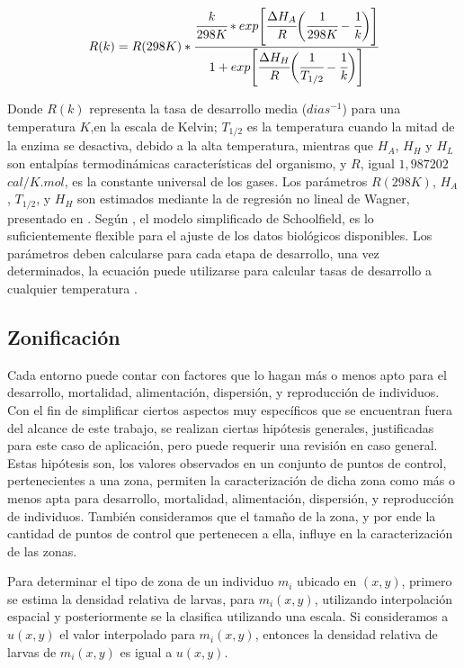 \begin{equation} \label{eq:schoolfield}
   R(k)  = R(298K) *\cfrac{ \cfrac{k}{298K} *
    exp \Bigg[
            \cfrac{\Delta H_{A}}{R} \bigg(\cfrac{1}{298K} - \cfrac{1}{k}\bigg)
        \Bigg]}
    {1 + exp\Bigg[\cfrac{\Delta H_{H}}{R} \bigg(\cfrac{1}{T_{1/2}}- \cfrac{1}{k}\bigg)\Bigg] }
\end{equation}

Donde $R(k)$ representa la tasa de desarrollo media ($dias^{-1}$) para una temperatura $K$,en la
escala de Kelvin; $T_{1/2}$ es la temperatura cuando la mitad de la enzima se desactiva, debido a
la alta temperatura, mientras que $H_{A}$, $H_{H}$ y $H_{L}$ son entalpías termodinámicas
características del organismo, y $R$, igual $1,987202$ $cal/K.mol$, es la constante universal de
los gases. Los parámetros $R(298K)$, $H_{A}$, $T_{1/2}$, y $H_{H}$ son estimados mediante la
de regresión no lineal de Wagner, presentado en \cite{wagner1984modeling}. Según
\cite{otero2006stochastic}, el modelo simplificado de Schoolfield, es lo suficientemente
flexible para el ajuste de los datos biológicos disponibles. Los parámetros deben calcularse para
cada etapa de desarrollo, una vez determinados, la ecuación puede utilizarse para calcular tasas
de desarrollo a cualquier temperatura \cite{rueda1990temperature}.

\subsection{Zonificación}
\label{subsec:cap4-zonificacion}
Cada entorno puede contar con factores que lo hagan más o menos apto para el desarrollo,
mortalidad, alimentación, dispersión, y reproducción de individuos. Con el fin de
simplificar ciertos aspectos muy específicos que se encuentran fuera del alcance de este trabajo,
se realizan ciertas hipótesis generales, justificadas para este caso de aplicación, pero puede
requerir una revisión en caso general. Estas hipótesis son, los valores observados en un
conjunto de puntos de control, pertenecientes a una zona, permiten la caracterización de dicha
zona como más o menos apta para desarrollo, mortalidad, alimentación, dispersión, y reproducción de
individuos. También consideramos que el tamaño de la zona, y por ende la cantidad de puntos de
control que pertenecen a ella, influye en la caracterización de las zonas.

Para determinar el tipo de zona de un individuo $m_{i}$ ubicado en $(x,y)$, primero se estima la
densidad relativa de larvas, para $m_{i}(x,y)$, utilizando interpolación espacial y posteriormente
se la clasifica utilizando una escala. Si consideramos a $u(x,y)$ el valor interpolado para
$m_{i}(x,y)$, entonces la densidad relativa de larvas de $m_{i}(x,y)$ es igual a $u(x,y)$.

